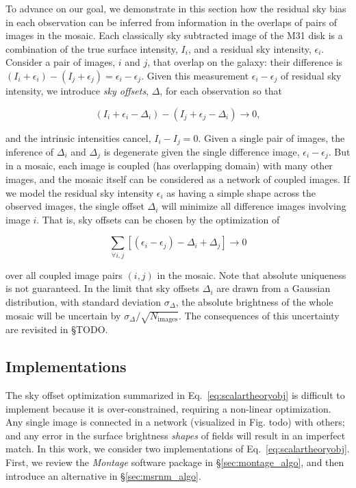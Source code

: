 \documentclass[iop]{emulateapj}
\newcommand{\sw}[1]{\textit{#1}} %
\newcommand{\todo}[1]{\textcolor{BurntOrange}{\textsf{#1}}} %
\newcommand{\Eq}[1]{Eq.~\ref{eq:#1}}  %
\newcommand{\Sec}[1]{\S\ref{sec:#1}}  %
\begin{document}
To advance on our goal, we demonstrate in this section how the residual sky bias in each observation can be inferred from information in the overlaps of pairs of images in the mosaic.
Each classically sky subtracted image of the M31 disk is a combination of the true surface intensity, $I_i$, and a residual sky intensity, $\epsilon_i$.
Consider a pair of images, $i$ and $j$, that overlap on the galaxy: their difference is $(I_i+\epsilon_i) - (I_j+\epsilon_j) = \epsilon_i - \epsilon_j$.
Given this measurement $\epsilon_i - \epsilon_j$ of residual sky intensity, we introduce \emph{sky offsets}, $\Delta$, for each observation so that

\begin{equation}
    (I_i + \epsilon_i - \Delta_i) - (I_j + \epsilon_j - \Delta_i) \rightarrow 0,
\end{equation}

\noindent and the intrinsic intensities cancel, $I_i - I_j = 0$.
Given a single pair of images, the inference of $\Delta_i$ and $\Delta_j$ is degenerate given the single difference image, $\epsilon_i-\epsilon_j$.
But in a mosaic, each image is coupled (has overlapping domain) with many other images, and the mosaic itself can be considered as a network of coupled images.
If we model the residual sky intensity $\epsilon_i$ as having a simple shape across the observed images, the single offset $\Delta_i$ will minimize all difference images involving image $i$.
That is, sky offsets can be chosen by the optimization of

\begin{equation}
    \sum_{\forall i,j} [(\epsilon_i - \epsilon_j) - \Delta_i + \Delta_j] \rightarrow 0
    \label{eq:scalartheoryobj}
\end{equation}

\noindent over all coupled image pairs $(i,j)$ in the mosaic.
Note that absolute uniqueness is not guaranteed.
In the limit that sky offsets $\Delta_i$ are drawn from a Gaussian distribution, with standard deviation $\sigma_\Delta$, the absolute brightness of the whole mosaic will be uncertain by $\sigma_\Delta / \sqrt{N_\mathrm{images}}$.
The consequences of this uncertainty are revisited in \S\todo{TODO}.

\subsection{Implementations}
\label{sec:offset_algos}

The sky offset optimization summarized in \Eq{scalartheoryobj} is difficult to implement because it is over-constrained, requiring a non-linear optimization.
Any single image is connected in a network (visualized in Fig. \todo{todo}) with others; and any error in the surface brightness \emph{shapes} of fields will result in an imperfect match.
In this work, we consider two implementations of \Eq{scalartheoryobj}.
First, we review the \sw{Montage} software package in \Sec{montage_algo}, and then introduce an alternative in \Sec{msrnm_algo}.
\end{document}
